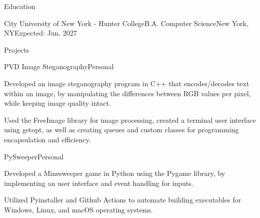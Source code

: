 \documentclass[]{kyvernitis-resume}
\begin{document}
\resumeheader
{}
{}
{}
{}
{}

\begin{section}{Education}
    \begin{subsectionnobullet}{City University of New York - Hunter College}{B.A. Computer Science}{New York, NY}{Expected: Jun. 2027}
    \end{subsectionnobullet}
\end{section}



\begin{section}{Projects}

\begin{subsectionproject}{PVD Image Steganography}{Personal}{}
    \item{Developed an image steganography program in C++ that encodes/decodes text within an image, by manipulating the differences between RGB values per pixel, while keeping image quality intact.}
    \item{Used the FreeImage library for image processing, created a terminal user interface using getopt, as well as creating queues and custom classes for programming encapsulation and efficiency.}
\end{subsectionproject}

\begin{subsectionproject}{PySweeper}{Personal}{}
    \item{Developed a Minesweeper game in Python using the Pygame library, by implementing an user interface and event handling for inputs.}
    \item{Utilized Pyinstaller and Github Actions to automate building executables for Windows, Linux, and macOS operating systems.}
\end{subsectionproject}

\end{section}

\end{document}
